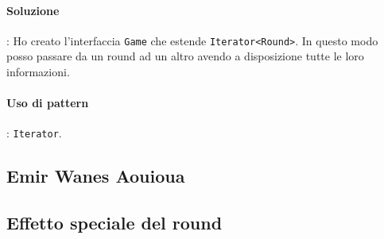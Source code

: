\documentclass[a4paper,12pt]{report}
\begin{document}
\paragraph{Soluzione}: Ho creato l'interfaccia \texttt{Game} che estende \texttt{Iterator<Round>}. In questo modo posso passare da un round ad un altro avendo a disposizione tutte le loro informazioni.

\paragraph{Uso di pattern}: \texttt{Iterator}.
\\
\subsection{Emir Wanes Aouioua}
\subsection*{Effetto speciale del round}
\end{document}
